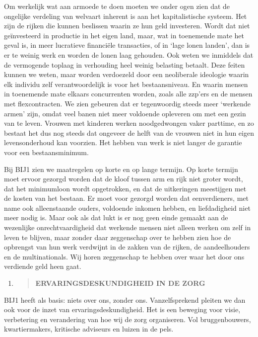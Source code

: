 Om werkelijk wat aan armoede te doen moeten we onder ogen zien dat de
ongelijke verdeling van welvaart inherent is aan het kapitalistische
systeem. Het zijn de rijken die kunnen beslissen waarin ze hun geld
investeren. Wordt dat niet geïnvesteerd in productie in het eigen land,
maar, wat in toenemende mate het geval is, in meer lucratieve financiële
transacties, of in `lage lonen landen', dan is er te weinig werk en
worden de lonen laag gehouden. Ook weten we inmiddels dat de vermogende
toplaag in verhouding heel weinig belasting betaalt. Deze feiten kunnen
we weten, maar worden verdoezeld door een neoliberale ideologie waarin
elk individu zelf verantwoordelijk is voor het bestaansniveau. En waarin
mensen in toenemende mate elkaars concurrenten worden, zoals alle
zzp'ers en de mensen met flexcontracten. We zien gebeuren dat er
tegenwoordig steeds meer `werkende armen' zijn, omdat veel banen niet
meer voldoende opleveren om met een gezin van te leven. Vrouwen met
kinderen werken noodgedwongen vaker parttime, en zo bestaat het dus nog
steeds dat ongeveer de helft van de vrouwen niet in hun eigen
levensonderhoud kan voorzien. Het hebben van werk is niet langer de
garantie voor een bestaansminimum.

Bij BIJ1 zien we maatregelen op korte en op lange termijn. Op korte
termijn moet ervoor gezorgd worden dat de kloof tussen arm en rijk niet
groter wordt, dat het minimumloon wordt opgetrokken, en dat de
uitkeringen meestijgen met de kosten van het bestaan. Er moet voor
gezorgd worden dat eenverdieners, met name ook alleenstaande ouders,
voldoende inkomen hebben, en liefdadigheid niet meer nodig is. Maar ook
als dat lukt is er nog geen einde gemaakt aan de wezenlijke
onrechtvaardigheid dat werkende mensen niet alleen werken om zelf in
leven te blijven, maar zonder daar zeggenschap over te hebben zien hoe
de opbrengst van hun werk verdwijnt in de zakken van de rijken, de
aandeelhouders en de multinationals. Wij horen zeggenschap te hebben
over waar het door ons verdiende geld heen gaat.

\begin{enumerate}
\def\labelenumi{\arabic{enumi}.}
\setcounter{enumi}{3}
\item
  \begin{quote}
  \textbf{ERVARINGSDESKUNDIGHEID IN DE ZORG}
  \end{quote}
\end{enumerate}

BIJ1 heeft als basis: niets over ons, zonder ons. Vanzelfsprekend
pleiten we dan ook voor de inzet van ervaringsdeskundigheid. Het is een
beweging voor visie, verbetering en verandering van hoe wij de zorg
organiseren. Vol bruggenbouwers, kwartiermakers, kritische adviseurs en
luizen in de pels.

